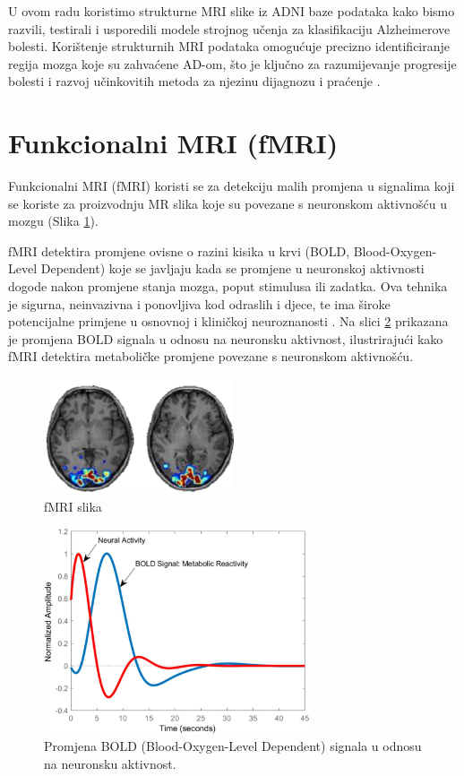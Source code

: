 \documentclass[zavrsnirad]{fer}
\begin{document}
 U ovom radu koristimo strukturne MRI slike iz ADNI baze podataka kako bismo razvili, testirali i usporedili modele strojnog učenja za klasifikaciju Alzheimerove bolesti. Korištenje strukturnih MRI podataka omogućuje precizno identificiranje regija mozga koje su zahvaćene AD-om, što je ključno za razumijevanje progresije bolesti i razvoj učinkovitih metoda za njezinu dijagnozu i praćenje \cite{Gonuguntla2022}.


\section{Funkcionalni MRI (fMRI)}

Funkcionalni MRI (fMRI) koristi se za detekciju malih promjena u signalima koji se koriste za proizvodnju MR slika koje su povezane s neuronskom aktivnošću u mozgu (Slika \ref{fig:fMRI}). 

fMRI detektira promjene ovisne o razini kisika u krvi (BOLD, Blood-Oxygen-Level Dependent) koje se javljaju kada se promjene u neuronskoj aktivnosti dogode nakon promjene stanja mozga, poput stimulusa ili zadatka. Ova tehnika je sigurna, neinvazivna i ponovljiva kod odraslih i djece, te ima široke potencijalne primjene u osnovnoj i kliničkoj neuroznanosti \cite{Gore2003}. Na slici \ref{fig:fMRI_BOLD} prikazana je promjena BOLD signala u odnosu na neuronsku aktivnost, ilustrirajući kako fMRI detektira metaboličke promjene povezane s neuronskom aktivnošću.


\begin{figure}[h]
	\centering
	\includegraphics[width=0.5\textwidth]{Figures/fMRI.png}
	\caption{fMRI slika \cite{ucsd2021}}
	\label{fig:fMRI}
\end{figure}

\begin{figure}[h]
	\centering
	\includegraphics[width=0.7\textwidth]{Figures/BOLD.jpg}
	\caption{Promjena BOLD (Blood-Oxygen-Level Dependent) signala u odnosu na neuronsku aktivnost.\cite{Schaper573006}}
	\label{fig:fMRI_BOLD}
\end{figure}
\end{document}
